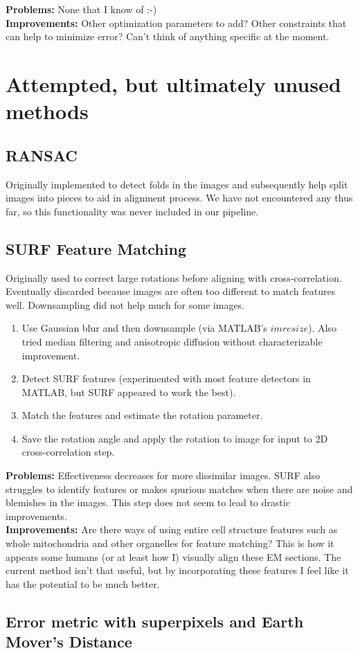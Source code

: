 \documentclass{article}
\begin{document}
\textbf{Problems:} None that I know of :-)\\
\textbf{Improvements:} Other optimization parameters to add? Other constraints that can help to minimize error? Can't think of anything specific at the moment.


\section{Attempted, but ultimately unused methods}
\subsection{RANSAC}
Originally implemented to detect folds in the images and subsequently help split images into pieces to aid in alignment process. We have not encountered any thus far, so this functionality was never included in our pipeline.
\subsection{SURF Feature Matching}
Originally used to correct large rotations before aligning with cross-correlation. Eventually discarded because images are often too different to match features well. Downsampling did not help much for some images.\\
\begin{enumerate}
\item Use Gaussian blur and then downsample (via MATLAB's $imresize$). Also tried median filtering and anisotropic diffusion without characterizable improvement.
\item Detect SURF features (experimented with most feature detectors in MATLAB, but SURF appeared to work the best). 
\item Match the features and estimate the rotation parameter.
\item Save the rotation angle and apply the rotation to image for input to 2D cross-correlation step.
\end{enumerate}
\textbf{Problems:} Effectiveness decreases for more dissimilar images. SURF also struggles to identify features or makes spurious matches when there are noise and blemishes in the images. This step does not seem to lead to drastic improvements. \\
\textbf{Improvements:} Are there ways of using entire cell structure features such as whole mitochondria and other organelles for feature matching? This is how it appears some humans (or at least how I) visually align these EM sections. The current method isn't that useful, but by incorporating these features I feel like it has the potential to be much better.
\subsection{Error metric with superpixels and Earth Mover's Distance}
\end{document}
